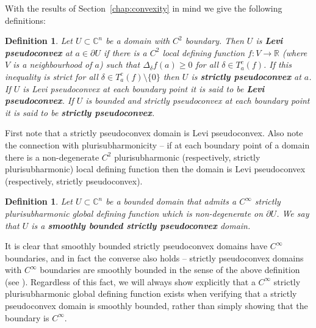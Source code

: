 \documentclass[11pt,a4paper, final, twoside]{article}
\newtheorem{definition}[theorem]{Definition}
\numberwithin{equation}{section}
\newcommand{\C}{\mathbb C}
\newcommand{\R}{\mathbb R}
\newcommand{\bd}{\partial}
\newcommand{\cts}{C}
\begin{document}
With the results of Section~\ref{chap:convexity} in mind we give the following definitions:
\begin{definition}
Let $U\subset\C^n$ be a domain with $\cts^2$ boundary. Then $U$ is \textbf{Levi pseudoconvex} at $a\in\bd U$ if 
there is a $\cts^2$ local defining function $f\colon V\to\R$ (where $V$ is a neighbourhood of $a$)
such that $\Delta_\delta f(a)\geq 0$ for all $\delta\in T^c_a(f)$. 
If this inequality is strict for all $\delta\in T^c_a(f)\setminus\{0\}$
then $U$ is \textbf{strictly pseudoconvex} at $a$. If $U$ is Levi pseudoconvex at each boundary point it is said to be
\textbf{Levi pseudoconvex}. If $U$ is bounded and strictly pseudoconvex at each boundary point it is said to be \textbf{strictly pseudoconvex}.
\end{definition}
First note that a strictly pseudoconvex domain is Levi pseudoconvex.
Also note the connection with plurisubharmonicity -- if at each boundary point of a domain there 
is a non-degenerate $\cts^2$ plurisubharmonic (respectively, strictly plurisubharmonic) local defining function then the domain is Levi pseudoconvex (respectively, strictly pseudoconvex).
\begin{definition}
Let $U\subset\C^n$ be a bounded domain that admits a $\cts^\infty$ strictly plurisubharmonic global defining function which is non-degenerate on $\bd U$.
We say that $U$ is a \textbf{smoothly bounded strictly pseudoconvex} domain.
\end{definition}
It is clear that smoothly bounded strictly pseudoconvex domains have $\cts^\infty$ boundaries, and in fact the converse also holds -- strictly pseudoconvex domains with $\cts^\infty$
boundaries are smoothly bounded in the sense of the above definition (see \cite[page 59]{range}). 
Regardless of this fact, we will always show explicitly that a $\cts^\infty$ strictly plurisubharmonic global defining function exists when verifying that a strictly pseudoconvex
domain is smoothly bounded,
rather than simply showing that the boundary is $\cts^\infty$.
\end{document}
